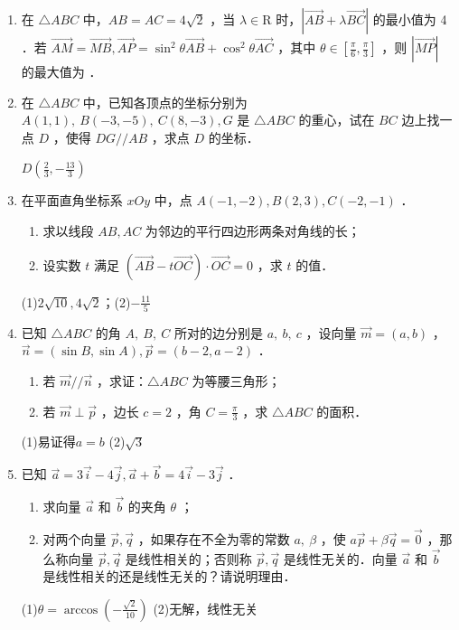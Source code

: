 \begin{enumerate}
    \item 在 $\triangle A B C$ 中，$A B=A C=4 \sqrt{2}$ ，当 $\lambda \in \mathrm{R}$ 时，$|\overrightarrow{A B}+\lambda \overrightarrow{B C}|$ 的最小值为 4 ．若 $\overrightarrow{A M}=\overrightarrow{M B}, \overrightarrow{A P}=\sin ^2 \theta \overrightarrow{A B}+\cos ^2 \theta \overrightarrow{A C}$ ，其中 $\theta \in\left[\frac{\pi}{6}, \frac{\pi}{3}\right]$ ，则 $|\overrightarrow{M P}|$ 的最大值为 ．

\item 在 $\triangle A B C$ 中，已知各顶点的坐标分别为 $A(1,1), ~ B(-3,-5), ~ C(8,-3), G$ 是 $\triangle A B C$ 的重心，试在 $B C$ 边上找一点 $D$ ，使得 $D G / / A B$ ，求点 $D$ 的坐标．
\begin{jieda}
    $D(\frac{2}{3},-\frac{13}{3})$
\end{jieda}

\item 在平面直角坐标系 $x O y$ 中，点 $A(-1,-2), B(2,3), C(-2,-1)$ ．
\begin{enumerate}
    \item 求以线段 $A B,  A C$ 为邻边的平行四边形两条对角线的长；
    \item 设实数 $t$ 满足 $(\overrightarrow{A B}-t \overrightarrow{O C}) \cdot \overrightarrow{O C}=0$ ，求 $t$ 的值．
\end{enumerate}
\begin{jieda}
    (1)$2\sqrt{10},4\sqrt{2}$；(2)$-\frac{11}{5}$
\end{jieda}


\item 已知 $\triangle A B C$ 的角 $A, ~ B, ~ C$ 所对的边分别是 $a, ~ b, ~ c$ ，设向量 $\vec{m}=(a, b)$ ， $\vec{n}=(\sin B, \sin A), \vec{p}=(b-2, a-2)$ ．
\begin{enumerate}
    \item 若 $\vec{m} / / \vec{n}$ ，求证：$\triangle A B C$ 为等腰三角形；
    \item 若 $\vec{m} \perp \vec{p}$ ，边长 $c=2$ ，角 $C=\frac{\pi}{3}$ ，求 $\triangle A B C$ 的面积．
\end{enumerate}
\begin{jieda}
    (1)易证得$a=b$
    (2)$\sqrt{3}$
\end{jieda}

\item 已知 $\vec{a}=3\vec{i}-4\vec{j},\vec{a}+\vec{b}=4\vec{i}-3\vec{j}$ ．
    \begin{enumerate}
        \item 求向量 $\vec{a}$ 和 $\vec{b}$ 的夹角 $\theta$ ；
        \item 对两个向量 $\vec{p}, \vec{q}$ ，如果存在不全为零的常数 $a, ~ \beta$ ，使 $a \vec{p}+\beta \vec{q}=\overrightarrow{0}$ ，那么称向量 $\vec{p}, \vec{q}$ 是线性相关的；否则称 $\vec{p}, \vec{q}$ 是线性无关的．向量 $\vec{a}$ 和 $\vec{b}$ 是线性相关的还是线性无关的？请说明理由．
    \end{enumerate}
\begin{jieda}
    (1)$\theta=\arccos(-\frac{\sqrt{2}}{10})$
    (2)无解，线性无关
\end{jieda}
\end{enumerate}

